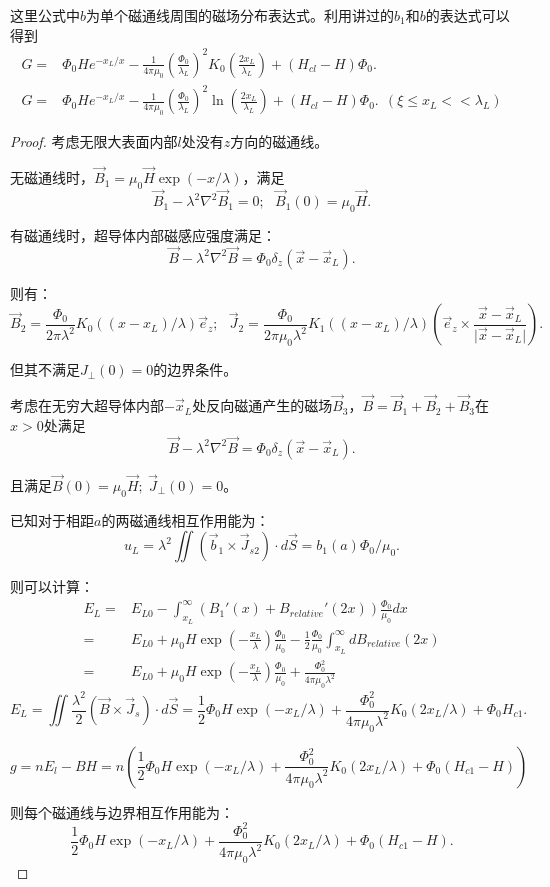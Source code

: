 \documentclass[reqno,a4paper,12pt]{amsart}
\begin{document}
这里公式中$b$为单个磁通线周围的磁场分布表达式。利用讲过的$b_1$和$b$的表达式可以得到
\begin{align*}
	G =& \Phi_0 H e^{-x_L/x} - \frac{1}{4\pi\mu_0} \left( \frac{\Phi_0}{\lambda_L} \right)^2 K_0 \left( \frac{2x_L}{\lambda_L} \right) + (H_{cl} - H) \Phi_0. \\
	G =& \Phi_0 H e^{-x_L/x} - \frac{1}{4\pi\mu_0} \left( \frac{\Phi_0}{\lambda_L} \right)^2 \ln \left( \frac{2x_L}{\lambda_L} \right) + (H_{cl} - H) \Phi_0. \ \ (\xi \leq x_L << \lambda_L)
\end{align*}

\begin{proof}
考虑无限大表面内部$l$处没有$z$方向的磁通线。

无磁通线时，$\vec{B}_1 = \mu_0 \vec{H} \exp(-x/\lambda)$，满足
\[
	\vec{B}_1 - \lambda^2\nabla^2 \vec{B}_1 = 0; \ \ \ \vec{B}_1(0) = \mu_0 \vec{H}.
\]

有磁通线时，超导体内部磁感应强度满足：
\[
	\vec{B} - \lambda^2\nabla^2 \vec{B} = \Phi_0 \delta_z(\vec{x} - \vec{x}_L).
\]

则有：
\[
	\vec{B}_2 = \frac{\Phi_0}{2\pi\lambda^2} K_0((x-x_L)/\lambda) \vec{e}_z; \ \ \ \vec{J}_2 = \frac{\Phi_0}{2\pi\mu_0\lambda^2} K_1((x-x_L)/\lambda) \left( \vec{e}_z \times \frac{\vec{x}-\vec{x}_L}{\vert \vec{x}-\vec{x}_L \vert} \right).
\]

但其不满足$J_\perp(0) = 0$的边界条件。

考虑在无穷大超导体内部$-\vec{x}_L$处反向磁通产生的磁场$\vec{B}_3$，$\vec{B} = \vec{B}_1 + \vec{B}_2 + \vec{B}_3$在$x>0$处满足
\[
	\vec{B} - \lambda^2\nabla^2 \vec{B} = \Phi_0 \delta_z(\vec{x} - \vec{x}_L).
\]

且满足$\vec{B}(0) = \mu_0\vec{H}; \ \vec{J}_\perp(0) = 0$。

已知对于相距$a$的两磁通线相互作用能为：
\[
	u_L = \lambda^2 \iint (\vec{b}_1 \times \vec{J}_{s2}) \cdot d\vec{S} = b_1(a) \Phi_0 /\mu_0.
\]

则可以计算：
\begin{align*}
	E_L =& E_{L0} - \int_{x_L}^\infty (B_1'(x) + B_{relative}'(2x)) \frac{\Phi_0}{\mu_0} dx \\
	=& E_{L0} + \mu_0 H \exp\left( -\frac{x_L}{\lambda} \right) \frac{\Phi_0}{\mu_0} - \frac{1}{2}\frac{\Phi_0}{\mu_0} \int_{x_L}^\infty dB_{relative}(2x) \\
	=& E_{L0} + \mu_0H \exp\left(-\frac{x_L}{\lambda}\right) \frac{\Phi_0}{\mu_0} + \frac{\Phi_0^2}{4\pi\mu_0\lambda^2}
\end{align*}
\[
	E_L = \iint \frac{\lambda^2}{2} (\vec{B} \times \vec{J}_s) \cdot d\vec{S} = \frac{1}{2} \Phi_0 H \exp(-x_L/\lambda) + \frac{\Phi_0^2}{4\pi\mu_0\lambda^2} K_0(2x_L/\lambda) + \Phi_0 H_{c1}.
\]

\[
	g = nE_l - BH = n\left( \frac{1}{2}\Phi_0 H \exp(-x_L/\lambda) + \frac{\Phi_0^2}{4\pi\mu_0\lambda^2}K_0(2x_L/\lambda) + \Phi_0(H_{c1}- H) \right)
\]

则每个磁通线与边界相互作用能为：
\[
	\frac{1}{2}\Phi_0 H \exp(-x_L/\lambda) + \frac{\Phi_0^2}{4\pi\mu_0\lambda^2}K_0(2x_L/\lambda) + \Phi_0(H_{c1}- H).
\]
\end{proof}
\end{document}
